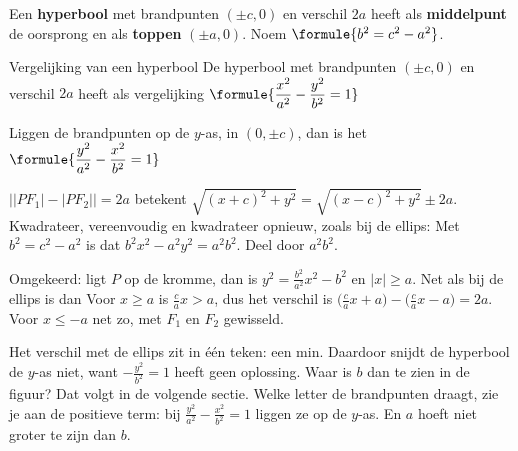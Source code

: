 \begin{theorie}
Een \textbf{\textcolor{accent}{hyperbool}} met brandpunten $(\pm c, 0)$ en verschil $2a$ heeft als \textbf{\textcolor{accent}{middelpunt}} de oorsprong en als \textbf{\textcolor{accent}{toppen}} $(\pm a, 0)$. Noem $\formule{b^2 = c^2 - a^2}$.

\begin{stelling}{Vergelijking van een hyperbool}
De hyperbool met brandpunten $(\pm c, 0)$ en verschil $2a$ heeft als vergelijking \qquad $\formule{\dfrac{x^2}{a^2} - \dfrac{y^2}{b^2} = 1}$

\vspace{1mm}
Liggen de brandpunten op de $y$-as, in $(0, \pm c)$, dan is het \qquad $\formule{\dfrac{y^2}{a^2} - \dfrac{x^2}{b^2} = 1}$
\end{stelling}

\begin{bewijs}
$\bigl||PF_1| - |PF_2|\bigr| = 2a$ betekent $\sqrt{(x + c)^2 + y^2} = \sqrt{(x - c)^2 + y^2} \pm 2a$. Kwadrateer, vereenvoudig en kwadrateer opnieuw, zoals bij de ellips:
Met $b^2 = c^2 - a^2$ is dat $b^2x^2 - a^2y^2 = a^2b^2$. Deel door $a^2b^2$.

Omgekeerd: ligt $P$ op de kromme, dan is $y^2 = \tfrac{b^2}{a^2}x^2 - b^2$ en $|x| \geqslant a$. Net als bij de ellips is dan
Voor $x \geqslant a$ is $\tfrac ca x > a$, dus het verschil is $\bigl(\tfrac ca x + a\bigr) - \bigl(\tfrac ca x - a\bigr) = 2a$. Voor $x \leqslant -a$ net zo, met $F_1$ en $F_2$ gewisseld.
\end{bewijs}
\end{theorie}

Het verschil met de ellips zit in één teken: een min. Daardoor snijdt de hyperbool de $y$-as niet, want $-\tfrac{y^2}{b^2} = 1$ heeft geen oplossing. Waar is $b$ dan te zien in de figuur? Dat volgt in de volgende sectie. Welke letter de brandpunten draagt, zie je aan de positieve term: bij $\tfrac{y^2}{a^2} - \tfrac{x^2}{b^2} = 1$ liggen ze op de $y$-as. En $a$ hoeft niet groter te zijn dan $b$.


